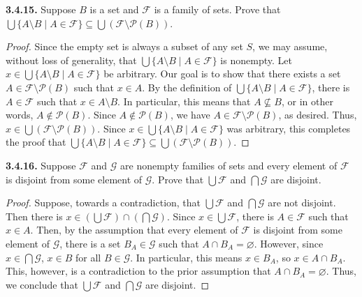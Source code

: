 \documentclass[12pt]{amsart}
\newenvironment{statement}[1]{\smallskip\noindent\color[rgb]{.6627, .3529, .6314} {\bf #1.}}{}
\theoremstyle{definition}
\theoremstyle{remark}
\newcommand{\powerset}[1]{\mathscr{P} \left( #1 \right)}
\begin{document}
\begin{statement}{3.4.15}
Suppose $B$ is a set and $\mathcal{F}$ is a family of sets.
Prove that $\bigcup \{ A \setminus B \mid A \in \mathcal{F} \} \subseteq \bigcup (\mathcal{F} \setminus \powerset{B})$.
\end{statement}

\begin{proof}
Since the empty set is always a subset of any set $S$, we may assume, without loss of generality, that $\bigcup \{ A \setminus B \mid A \in \mathcal{F} \}$ is nonempty.
Let $x \in \bigcup \{ A \setminus B \mid A \in \mathcal{F} \}$ be arbitrary.
Our goal is to show that there exists a set $A \in \mathcal{F} \setminus \powerset{B}$ such that $x \in A$.
By the definition of $\bigcup \{ A \setminus B \mid A \in \mathcal{F} \}$, there is $A \in \mathcal{F}$ such that $x \in A \setminus B$.
In particular, this means that $A \nsubseteq B$, or in other words, $A \notin \powerset{B}$.
Since $A \notin \powerset{B}$, we have $A \in \mathcal{F} \setminus \powerset{B}$, as desired.
Thus, $x \in \bigcup (\mathcal{F} \setminus \powerset{B})$.
Since $x \in \bigcup \{ A \setminus B \mid A \in \mathcal{F} \}$ was arbitrary, this completes the proof that $\bigcup \{ A \setminus B \mid A \in \mathcal{F} \} \subseteq \bigcup (\mathcal{F} \setminus \powerset{B})$.
\end{proof}


\begin{statement}{3.4.16}
Suppose $\mathcal{F}$ and $\mathcal{G}$ are nonempty families of sets and every element of $\mathcal{F}$ is disjoint from some element of $\mathcal{G}$.
Prove that $\bigcup \mathcal{F}$ and $\bigcap \mathcal{G}$ are disjoint.
\end{statement}

\begin{proof}
Suppose, towards a contradiction, that $\bigcup \mathcal{F}$ and $\bigcap \mathcal{G}$ are not disjoint.
Then there is $x \in \left( \bigcup \mathcal{F} \right) \cap \left( \bigcap \mathcal{G} \right)$.
Since $x \in \bigcup \mathcal{F}$, there is $A \in \mathcal{F}$ such that $x \in A$.
Then, by the assumption that every element of $\mathcal{F}$ is disjoint from some element of $\mathcal{G}$, there is a set $B_A \in \mathcal{G}$ such that $A \cap B_A = \varnothing$.
However, since $x \in \bigcap \mathcal{G}$, $x \in B$ for all $B \in \mathcal{G}$.
In particular, this means $x \in B_A$, so $x \in A \cap B_A$.
This, however, is a contradiction to the prior assumption that $A \cap B_A = \varnothing$.
Thus, we conclude that $\bigcup \mathcal{F}$ and $\bigcap \mathcal{G}$ are disjoint.
\end{proof}
\end{document}
